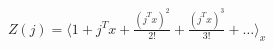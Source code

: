 \documentclass[preview]{standalone}
\begin{document}
\begin{align*}
Z(j) = \langle 1 + j^T x + \frac{(j^T x)^2}{2!} + \frac{(j^T x)^3}{3!} + \dots \rangle_x
\end{align*}
\end{document}
